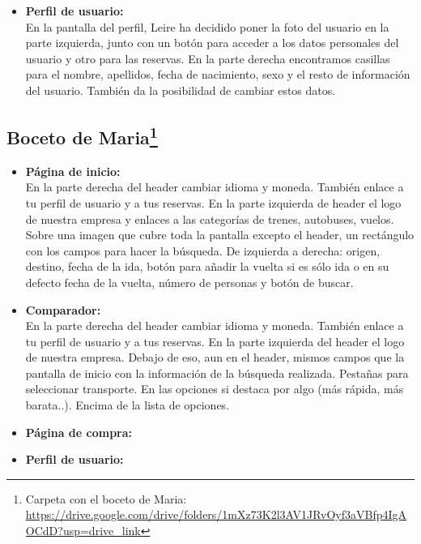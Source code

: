 \begin{itemize}
    \item\textbf{Perfil de usuario:} \\ En la pantalla del perfil, Leire ha decidido poner la foto del usuario en la parte izquierda, junto con un botón para acceder a los datos personales del usuario y otro para las reservas.
    En la parte derecha encontramos casillas para el nombre, apellidos, fecha de nacimiento, sexo y el resto de información del usuario. También da la posibilidad de cambiar estos datos.
    
\end{itemize}
\subsection[Boceto de Maria]{Boceto de Maria\footnote{Carpeta con el boceto de Maria: \url{https://drive.google.com/drive/folders/1mXz73K2l3AV1JRvOyf3aVBfp4IgAOCdD?usp=drive_link}}}

\begin{itemize}
    \item\textbf{Página de inicio:} \\ En la parte derecha del header cambiar idioma y moneda. También enlace a tu perfil de usuario y a tus reservas. 
    En la parte izquierda de header el logo de nuestra empresa y enlaces a las categorías de trenes, autobuses, vuelos.
    Sobre una imagen que cubre toda la pantalla excepto el header, un rectángulo con los campos para hacer la búsqueda. De izquierda a derecha: origen, destino, fecha de la ida, botón para añadir la vuelta si es sólo ida o en su defecto fecha de la vuelta, número de personas y botón de buscar. 
    
    \item\textbf{Comparador:} \\ En la parte derecha del header cambiar idioma y moneda. También enlace a tu perfil de usuario y a tus reservas. 
    En la parte izquierda del header el logo de nuestra empresa.
    Debajo de eso, aun en el header, mismos campos que la pantalla de inicio con la información de la búsqueda realizada.
    Pestañas para seleccionar transporte.
    En las opciones si destaca por algo (más rápida, más barata..).
    Encima de la lista de opciones.
    
    \item\textbf{Página de compra:} \\ 
    \item\textbf{Perfil de usuario:} \\ 
\end{itemize}


